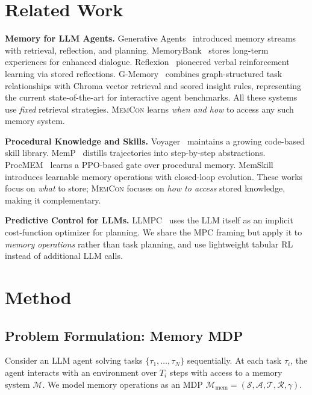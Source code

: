 \documentclass{article} %
\theoremstyle{plain}
\theoremstyle{definition}
\theoremstyle{remark}
\newcommand{\ours}{\textsc{MemCon}\xspace}
\begin{document}
\section{Related Work}
\label{sec:related}

\textbf{Memory for LLM Agents.}
Generative Agents~\citep{park2023generative} introduced memory streams with retrieval, reflection, and planning.
MemoryBank~\citep{zhong2024memorybank} stores long-term experiences for enhanced dialogue.
Reflexion~\citep{shinn2023reflexion} pioneered verbal reinforcement learning via stored reflections.
G-Memory~\citep{gmemory} combines graph-structured task relationships with Chroma vector retrieval and scored insight rules, representing the current state-of-the-art for interactive agent benchmarks.
All these systems use \emph{fixed} retrieval strategies.
\ours learns \emph{when and how} to access any such memory system.

\textbf{Procedural Knowledge and Skills.}
Voyager~\citep{wang2023voyager} maintains a growing code-based skill library.
MemP~\citep{memp} distills trajectories into step-by-step abstractions.
ProcMEM~\citep{procmem} learns a PPO-based gate over procedural memory.
MemSkill~\citep{memskill} introduces learnable memory operations with closed-loop evolution.
These works focus on \emph{what} to store; \ours focuses on \emph{how to access} stored knowledge, making it complementary.

\textbf{Predictive Control for LLMs.}
LLMPC~\citep{llmpc} uses the LLM itself as an implicit cost-function optimizer for planning.
We share the MPC framing but apply it to \emph{memory operations} rather than task planning, and use lightweight tabular RL instead of additional LLM calls.


\section{Method}
\label{sec:method}

\subsection{Problem Formulation: Memory MDP}
\label{sec:memory-mdp}

Consider an LLM agent solving tasks $\{\tau_1, \ldots, \tau_N\}$ sequentially.
At each task $\tau_i$, the agent interacts with an environment over $T_i$ steps with access to a memory system $\mathcal{M}$.
We model memory operations as an MDP $\mathcal{M}_{\text{mem}} = (\mathcal{S}, \mathcal{A}, \mathcal{T}, \mathcal{R}, \gamma)$.
\end{document}

